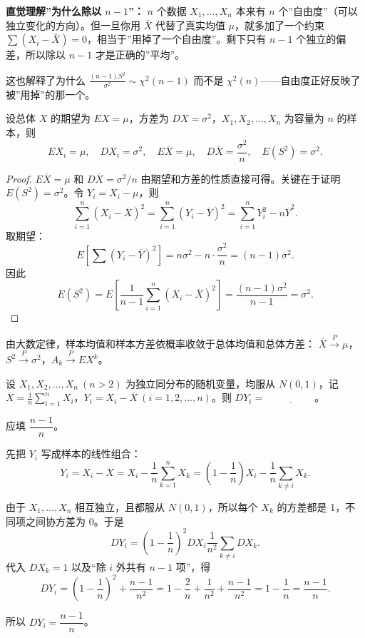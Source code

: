 ﻿\documentclass[lang=cn,11pt]{elegantbook}
\begin{document}
\begin{note}
\textbf{直觉理解”为什么除以 $n-1$”：} $n$ 个数据 $X_1,\dots,X_n$ 本来有 $n$ 个”自由度”（可以独立变化的方向）。但一旦你用 $\bar{X}$ 代替了真实均值 $\mu$，就多加了一个约束 $\sum(X_i-\bar{X})=0$，相当于”用掉了一个自由度”。剩下只有 $n-1$ 个独立的偏差，所以除以 $n-1$ 才是正确的”平均”。

这也解释了为什么 $\frac{(n-1)S^2}{\sigma^2}\sim\chi^2(n-1)$ 而不是 $\chi^2(n)$——自由度正好反映了被”用掉”的那一个。
\end{note}

\begin{property}[统计量的数字特征] \label{prop:stat-moment}
设总体 \(X\) 的期望为 \(EX = \mu\)，方差为 \(DX = \sigma^2\)，\(X_1, X_2, \dots, X_n\) 为容量为 \(n\) 的样本，则
\[
EX_i = \mu,\quad DX_i = \sigma^2,\quad E\overline{X} = \mu,\quad D\overline{X} = \frac{\sigma^2}{n},\quad E(S^2) = \sigma^2.
\]
\end{property}
\begin{proof}
\(E\overline{X} = \mu\) 和 \(D\overline{X} = \sigma^2/n\) 由期望和方差的性质直接可得。关键在于证明 \(E(S^2) = \sigma^2\)。令 \(Y_i = X_i - \mu\)，则
\[
\sum_{i=1}^{n}(X_i - \overline{X})^2 = \sum_{i=1}^{n}(Y_i - \overline{Y})^2 = \sum_{i=1}^{n} Y_i^2 - n\overline{Y}^2.
\]
取期望：
\[
E\!\left[\sum(Y_i - \overline{Y})^2\right] = n\sigma^2 - n\cdot\frac{\sigma^2}{n} = (n-1)\sigma^2.
\]
因此
\[
E(S^2) = E\!\left[\frac{1}{n-1}\sum_{i=1}^{n}(X_i-\overline{X})^2\right] = \frac{(n-1)\sigma^2}{n-1} = \sigma^2.
\]
\end{proof}

\begin{note}
由大数定律，样本均值和样本方差依概率收敛于总体均值和总体方差：
\(\overline{X} \stackrel{P}{\longrightarrow} \mu\)，\(S^2 \stackrel{P}{\longrightarrow} \sigma^2\)，\(A_k \stackrel{P}{\longrightarrow} EX^k\)。
\end{note}

\begin{exercise}\label{exer:6-yi-var}
设 \(X_1, X_2, \dots, X_n\ (n > 2)\) 为独立同分布的随机变量，均服从 \(N(0,1)\)，记 \(\overline{X} = \frac{1}{n}\sum_{i=1}^{n}X_i\)，\(Y_i = X_i - \overline{X}\ (i=1,2,\dots,n)\)。则 \(DY_i =\,\underline{\hspace{2cm}}\)。
\end{exercise}

\begin{solution}
应填 \(\dfrac{n-1}{n}\)。

先把 \(Y_i\) 写成样本的线性组合：
\[
Y_i=X_i-\overline{X}
=X_i-\frac{1}{n}\sum_{k=1}^{n}X_k
=\left(1-\frac{1}{n}\right)X_i-\frac{1}{n}\sum_{k\ne i}X_k.
\]

由于 \(X_1,\dots,X_n\) 相互独立，且都服从 \(N(0,1)\)，所以每个 \(X_k\) 的方差都是 1，不同项之间协方差为 0。于是
\[
DY_i
=\left(1-\frac{1}{n}\right)^2 DX_i
\frac{1}{n^2}\sum_{k\ne i}DX_k.
\]
代入 \(DX_k=1\) 以及“除 \(i\) 外共有 \(n-1\) 项”，得
\[
DY_i=\left(1-\frac{1}{n}\right)^2+\frac{n-1}{n^2}
=1-\frac{2}{n}+\frac{1}{n^2}+\frac{n-1}{n^2}
=1-\frac{1}{n}
=\frac{n-1}{n}.
\]

所以 \(DY_i=\dfrac{n-1}{n}\)。
\end{solution}
\end{document}
